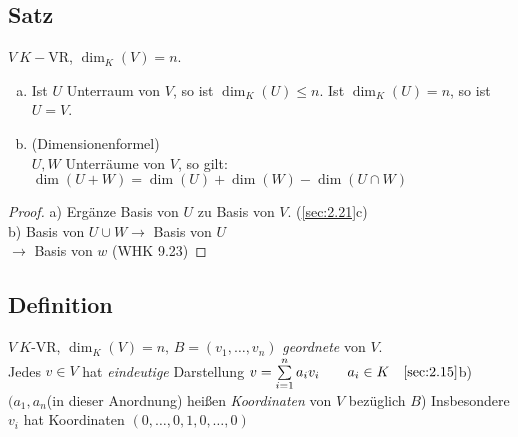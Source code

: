 \subsection{Satz}\label{sec:\thesubsection}
$V\ K-$VR, $\dim_K(V) = n$.
\begin{enumerate}[a)]
\item Ist $U$ Unterraum von $V$, so ist $\dim_K(U) \leq n$. Ist $\dim_K(U) = n$, so ist $U = V$.
\item (Dimensionenformel)\\
$U,W$ Unterräume von $V$, so gilt:\\
$\dim(U+W) = \dim(U) + \dim(W) - \dim(U \cap W)$
\end{enumerate}
\begin{proof}
a) Ergänze Basis von $U$ zu Basis von $V$. (\ref{sec:2.21}c)\\
b) Basis von $U \cup W\to$ Basis von $U$\\
\phantom{b) Basis von $U \cup W$} $\to$ Basis von $w$ (WHK 9.23)
\end{proof}
\subsection{Definition}\label{sec:\thesubsection}
$V\ K$-VR, $\dim_K(V) = n,\, B = (v_1,\ldots,v_n)$ \emph{geordnete} von $V$.\\
Jedes $v \in V$ hat \emph{eindeutige} Darstellung $v = \sum\limits_{i=1}^{n} a_iv_i\qquad a_i \in K\quad \ref{sec:2.15}$b)\\
$(a_1,a_n $(in dieser Anordnung) hei\ss en \emph{Koordinaten} von $V$ bezüglich $B$)
Insbesondere $v_i$ hat Koordinaten $(0,\ldots,0,1,0,\ldots,0)$
